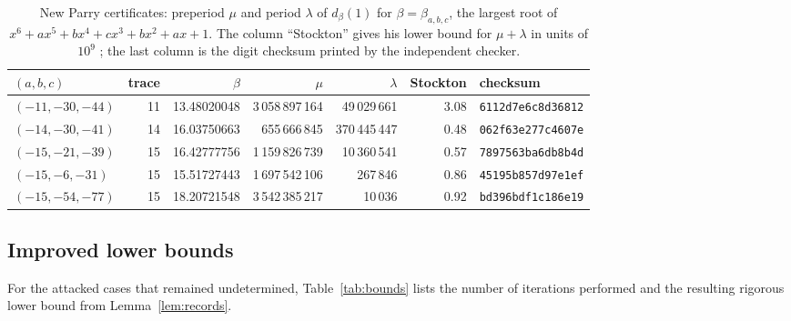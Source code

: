 \documentclass[11pt]{amsart}
\theoremstyle{definition}
\theoremstyle{remark}
\begin{document}
\begin{table}[ht]
\centering\small
\caption{New Parry certificates: preperiod $\mu$ and period $\lambda$ of $d_\beta(1)$ for $\beta=\beta_{a,b,c}$, the largest root of $x^6+ax^5+bx^4+cx^3+bx^2+ax+1$. The column ``Stockton'' gives his lower bound for $\mu+\lambda$ in units of $10^9$ \cite{Stockton}; the last column is the digit checksum printed by the independent checker.}\label{tab:new}
\begin{tabular}{@{}lrrrrrl@{}}
\toprule
$(a,b,c)$ & trace & $\beta$ & $\mu$ & $\lambda$ & Stockton & checksum\\
\midrule
$(-11,-30,-44)$ & 11 & 13.48020048 & 3\,058\,897\,164 & 49\,029\,661 & 3.08 & \texttt{6112d7e6c8d36812}\\
$(-14,-30,-41)$ & 14 & 16.03750663 & 655\,666\,845 & 370\,445\,447 & 0.48 & \texttt{062f63e277c4607e}\\
$(-15,-21,-39)$ & 15 & 16.42777756 & 1\,159\,826\,739 & 10\,360\,541 & 0.57 & \texttt{7897563ba6db8b4d}\\
$(-15,-6,-31)$ & 15 & 15.51727443 & 1\,697\,542\,106 & 267\,846 & 0.86 & \texttt{45195b857d97e1ef}\\
$(-15,-54,-77)$ & 15 & 18.20721548 & 3\,542\,385\,217 & 10\,036 & 0.92 & \texttt{bd396bdf1c186e19}\\
\bottomrule
\end{tabular}
\end{table}


\subsection{Improved lower bounds}
For the attacked cases that remained undetermined, Table~\ref{tab:bounds} lists the number of iterations performed and the resulting rigorous lower bound from Lemma~\ref{lem:records}.
\end{document}
